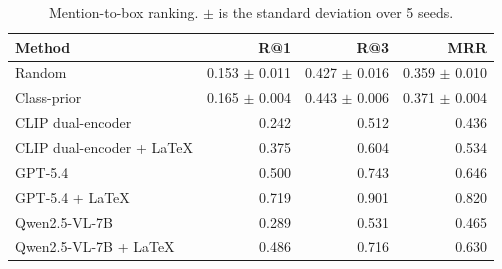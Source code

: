 \begin{table}[t]
\centering
\caption{Mention-to-box ranking. $\pm$ is the standard deviation over 5 seeds.}
\label{tab:main}
\begin{tabular}{lrrr}
\toprule
Method & R@1 & R@3 & MRR \\
\midrule
Random & 0.153 $\pm$ 0.011 & 0.427 $\pm$ 0.016 & 0.359 $\pm$ 0.010 \\
Class-prior & 0.165 $\pm$ 0.004 & 0.443 $\pm$ 0.006 & 0.371 $\pm$ 0.004 \\
CLIP dual-encoder & 0.242 & 0.512 & 0.436 \\
CLIP dual-encoder + LaTeX & 0.375 & 0.604 & 0.534 \\
GPT-5.4 & 0.500 & 0.743 & 0.646 \\
GPT-5.4 + LaTeX & 0.719 & 0.901 & 0.820 \\
Qwen2.5-VL-7B & 0.289 & 0.531 & 0.465 \\
Qwen2.5-VL-7B + LaTeX & 0.486 & 0.716 & 0.630 \\
\bottomrule
\end{tabular}
\end{table}
